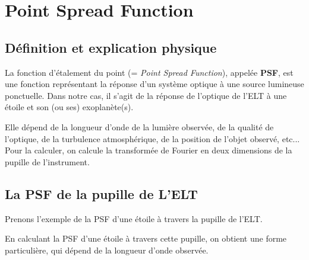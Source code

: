 \newpage
\section{\centering Point Spread Function}

\subsection{Définition et explication physique}

La fonction d'étalement du point (= \textsl{Point Spread Function}), appelée \textbf{PSF}, est une fonction représentant la réponse d'un système optique à une source lumineuse ponctuelle. Dans notre cas, il s'agit de la réponse de l'optique de l'ELT à une étoile et son (ou ses) exoplanète(s).

Elle dépend de la longueur d'onde de la lumière observée, de la qualité de l'optique, de la turbulence atmosphérique, de la position de l'objet observé, etc... Pour la calculer, on calcule la transformée de Fourier en deux dimensions de la pupille de l'instrument.


\subsection{La PSF de la pupille de L’ELT}

Prenons l'exemple de la PSF d'une étoile à travers la pupille de l'ELT.


En calculant la PSF d'une étoile à travers cette pupille, on obtient une forme particulière, qui dépend de la longueur d'onde observée.

